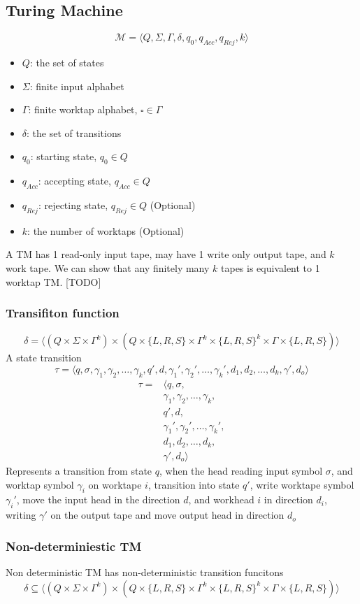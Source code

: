 \documentclass{article}
\newtheorem{definition}[theorem]{Definition}
\let\olddefinition\definition
\let\endolddefinition\enddefinition
\renewenvironment{definition}
  {\begin{tcolorbox}[
      colback=red!10,
      colframe=red!50!black,
      boxrule=0.6pt,
      arc=2pt,
      left=6pt,right=6pt,top=4pt,bottom=4pt,
      breakable
    ]\olddefinition}
  {\endolddefinition\end{tcolorbox}}
\begin{document}
\subsection{Turing Machine}
\begin{definition}[Turing Machine]
    \[\mathcal{M} = \langle Q, \Sigma, \Gamma, \delta, q_0, q_{Acc} , q_{Rej}, k\rangle\]
    \begin{itemize}
        \item $Q$: the set of states
        \item $\Sigma$: finite input alphabet
        \item $\Gamma$: finite worktap alphabet, $\square \in \Gamma$
        \item $\delta$: the set of transitions
        \item $q_0$: starting state, $q_0 \in Q$
        \item $q_{Acc}$: accepting state, $q_{Acc} \in Q$
        \item $q_{Rej}$: rejecting state, $q_{Rej} \in Q$   (Optional)
        \item $k$: the number of worktaps (Optional)
    \end{itemize}
    A TM has 1 read-only input tape, may have 1 write only output tape, and $k$ work tape. We can show that any finitely many $k$ tapes
    is equivalent to 1 worktap TM. [TODO]
    \subsubsection*{Transifiton function}
    \[\delta = \langle (Q\times \Sigma \times \Gamma^k) \times (Q \times \{L, R, S\} \times \Gamma^k \times \{L, R, S\}^k \times \Gamma \times \{L, R, S\}) \rangle\]
    A state transition 
    \[\tau = \langle q, \sigma, \gamma_1, \gamma_2, \dots, \gamma_k, q', d, \gamma_1', \gamma_2', \dots, \gamma_k', d_1, d_2, \dots, d_k, \gamma', d_o\rangle\]
    \begin{align*}
        \tau = &\langle q, \sigma, \\
        &\gamma_1, \gamma_2, \dots, \gamma_k, \\
        & q', d, \\
        &\gamma_1', \gamma_2', \dots, \gamma_k', \\
        &d_1, d_2, \dots, d_k, \\
        &\gamma', d_o\rangle
    \end{align*}
    Represents a transition from state $q$, when the head reading input symbol $\sigma$,
     and worktap symbol $\gamma_i$ on worktape $i$, transition into state $q'$, write worktape symbol $\gamma_i'$, move the input head in the direction $d$, 
     and workhead $i$ in direction $d_i$, writing $\gamma'$ on the output tape and move output head in direction $d_o$
     \subsubsection*{Non-determiniestic TM}
     Non deterministic TM has non-deterministic transition funcitons
    \[\delta \subseteq \langle (Q\times \Sigma \times \Gamma^k) \times (Q \times \{L, R, S\} \times \Gamma^k \times \{L, R, S\}^k \times \Gamma \times \{L, R, S\}) \rangle\]
\end{definition}
\end{document}
